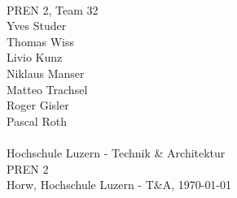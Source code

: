 \begin{titlepage}
    \begin{center}
        \parindent0pt{\Huge\bfseries \myDokumentTyp}\\[0.5cm]
        {\huge PREN 2, Team 32}\\[1cm]
        Yves Studer\\
        Thomas Wiss\\
        Livio Kunz\\
        Niklaus Manser\\
        Matteo Trachsel\\
        Roger Gisler\\
        Pascal Roth\\
        \vspace*{1cm}
        {\Huge \myTitel}\\[0.5cm]
        
        \vfill{}
        {\normalsize Hochschule Luzern - Technik \& Architektur\\
         PREN 2}\\[0.6cm]
        {\normalsize Horw, Hochschule Luzern - T\&A, \today}
    \end{center}
\end{titlepage}
